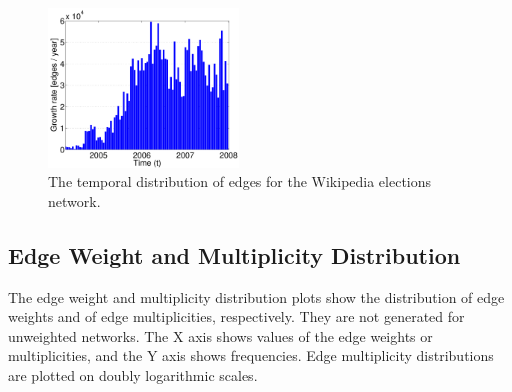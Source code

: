 \documentclass{article}
\newcommand{\wPlot}{0.45\textwidth}
\begin{document}
\begin{figure}
  \centering 
  \includegraphics[width=\wPlot]{plot/time_histogram.elec}
  \caption{ 
    The temporal distribution of edges for the Wikipedia
    elections network.  
  }
\end{figure}

\subsection{Edge Weight and Multiplicity Distribution}
The edge weight and multiplicity distribution plots show the
distribution of edge weights and of edge multiplicities, respectively.
They are not generated for unweighted networks.  The X axis shows values
of the edge weights or multiplicities, and the Y axis shows frequencies.
Edge multiplicity distributions are plotted on doubly logarithmic
scales.
\end{document}
